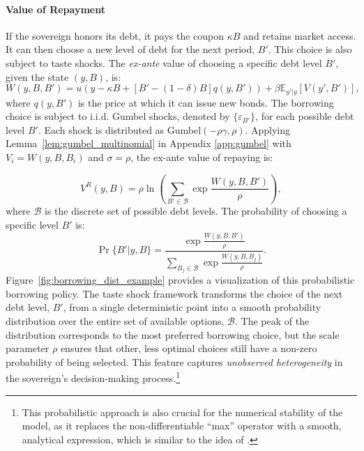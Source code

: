 \documentclass[12pt]{article}
\theoremstyle{plain}
\begin{document}
\paragraph{Value of Repayment }
If the sovereign honors its debt, it pays the coupon $\kappa B$ and retains
market access. It can then choose a new level of debt for the next period,
$B'$. This choice is also subject to taste shocks. The \emph{ex-ante} value of
choosing a specific debt level $B'$, given the state $(y, B)$, is:
\begin{equation}
	W(y, B, B') = u\left(y - \kappa B + \left[B' - (1-\delta)B\right] q(y, B')\right) + \beta \mathbb{E}_{y'|y} \left[V(y', B')\right],
\end{equation}
where $q(y, B')$ is the price at which it can issue new bonds. The borrowing choice is subject to i.i.d. Gumbel shocks, denoted by
$\{\varepsilon_{B'}\}$, for each possible debt level $B'$. Each shock is
distributed as Gumbel$(-\rho\gamma, \rho)$. Applying Lemma~\ref{lem:gumbel_multinomial} in Appendix \ref{app:gumbel} with $V_i = W(y, B, B_i)$ and
$\sigma = \rho$, the ex-ante value of repaying is:

\begin{equation}\label{eq:Vr}
	V^R(y, B) = \rho \ln\left( \sum_{B' \in \mathcal{B}} \exp\frac{W(y, B, B')}{\rho} \right),
\end{equation}
where $\mathcal{B}$ is the discrete set of possible debt levels. The probability of choosing a specific level $B'$ is:
\begin{equation}
	\Pr\{B' | y, B\} = \frac{\exp\frac{W(y, B, B')}{\rho}}{\sum_{B_j \in \mathcal{B}}\exp\frac{W(y, B, B_j)}{\rho}}.
\end{equation}
Figure~\ref{fig:borrowing_dist_example} provides a visualization of this
probabilistic borrowing policy. The taste shock framework transforms the choice
of the next debt level, $B'$, from a single deterministic point into a smooth
probability distribution over the entire set of available options,
$\mathcal{B}$. The peak of the distribution corresponds to the most preferred
borrowing choice, but the scale parameter $\rho$ ensures that other, less
optimal choices still have a non-zero probability of being selected. This
feature captures \textit{unobserved heterogeneity} in the sovereign's
decision-making process.\footnote{This probabilistic approach is also crucial
	for the numerical stability of the model, as it replaces the non-differentiable
	``max'' operator with a smooth, analytical expression, which is similar to the idea of \citep{ChatterjeeEyigungor2012}.}
\end{document}
